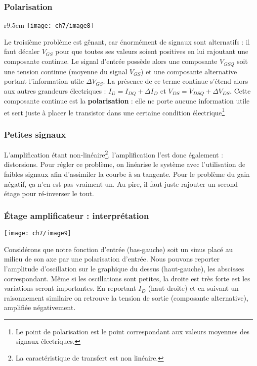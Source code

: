 	\subsubsection{Polarisation}
	\begin{wrapfigure}[8]{r}{9.5cm}
	\vspace{-0.5cm}
	\texttt{[image: ch7/image8]}
	\end{wrapfigure}
	Le troisième problème est gênant, car énormément de signaux sont alternatifs : il 
	faut décaler $V_{GS}$ pour que toutes ses valeurs soient positives en lui rajoutant 
	une composante continue. Le signal d'entrée possède alors une composante $V_{GSQ}$ 
	soit une tension continue (moyenne du signal $V_{GS}$) et une composante alternative 
	portant l'information utile $\Delta V_{GS}$. La présence de ce terme continue s'étend 
	alors aux autres grandeurs électriques : $I_D = I_{DQ} + \Delta I_D$ et $V_{DS} = 
	V_{DSQ}+\Delta V_{DS}$. Cette composante continue est la \textbf{polarisation} : elle 
	ne porte aucune information utile et sert juste à placer le transistor dans une 
	certaine condition électrique\footnote{Le point de polarisation est le point correspondant 
	aux valeurs moyennes des signaux électriques.}
	
	\subsubsection{Petites signaux}
	L'amplification étant non-linéaire\footnote{La caractéristique de transfert est non 
	linéaire.}, l'amplification l'est donc également : distorsions. Pour régler ce problème, 
	on linéarise le système avec l'utilisation de faibles signaux 	afin d'assimiler la courbe 
	à sa tangente. Pour le problème du gain négatif, ça n'en est pas vraiment un. Au pire, 
	il faut juste rajouter un second étage pour ré-inverser le tout.

	\subsubsection{Étage amplificateur : interprétation}
	\begin{center}
	\texttt{[image: ch7/image9]}
	\end{center}
	Considérons que notre fonction d'entrée (bas-gauche) soit un sinus placé au milieu de 
	son axe par une polarisation d'entrée. Nous pouvons reporter l'amplitude d'oscillation 
	sur le graphique du dessus (haut-gauche), les abscisses correspondant. Même si les 
	oscillations sont petites, la droite est très forte est les variations seront importantes. 
	En reportant $I_D$ (haut-droite) et en suivant un raisonnement similaire on retrouve la 
	tension de sortie (composante alternative), amplifiée négativement.
	
